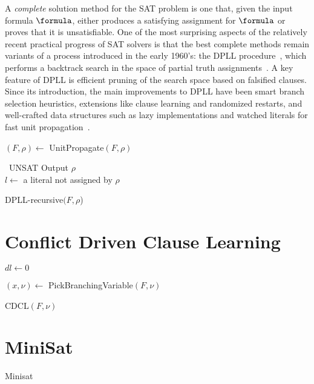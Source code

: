 A \emph{complete} solution method for the SAT problem is one that, given the
input formula $\formula$, either produces a satisfying assignment for $\formula$
or proves that it is unsatisfiable.  One of the most surprising aspects
of the relatively recent practical progress of SAT solvers is that the best
complete methods remain variants of a process introduced in the early 1960’s:
the DPLL procedure~\cite{satchapter}, which performs a backtrack search in the
space of partial truth assignments~\cite{DavisPutman:1960}. A key feature of
DPLL is efficient pruning of the search space based on falsified clauses. Since
its introduction, the main improvements to DPLL have been
smart branch selection heuristics, extensions like clause learning and
randomized restarts, and well-crafted data structures such as lazy
implementations and watched literals for fast unit propagation~\cite{satchapter}.

\begin{algorithm}[!ht]
\label{alg:dpll}


    $(F, \rho) \leftarrow$ UnitPropagate$(F,\rho)$

    {\Return~UNSAT}
    {Output $\rho$\\
    }
    $l \leftarrow$ a literal not assigned by $\rho$

    {}
\caption{DPLL-recursive$(F, \rho$)}
\end{algorithm}

\section{Conflict Driven Clause Learning}
\label{sec:cdcl}

\begin{algorithm}[!ht]
\label{alg:cdcl}
    \Input{}
    \Output{}

    {}

    $dl \leftarrow 0$

    {$(x, \nu) \leftarrow$ PickBranchingVariable$(F,\nu)$}

    
    \caption{CDCL$(F, \nu)$}
\end{algorithm}

\section{MiniSat}
\label{sec:minisat}
Minisat~\cite{minisat}

